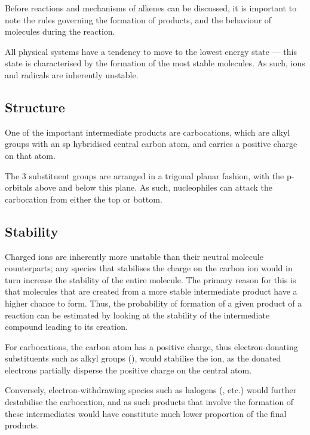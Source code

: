 		Before reactions and mechanisms of alkenes can be discussed, it is important to note the rules governing the formation
		of products, and the behaviour of molecules during the reaction.

		All physical systems have a tendency to move to the lowest energy state –– this state is characterised by the formation
		of the most stable molecules. As such, ions and radicals are inherently unstable.

		\subsection{Structure}

			One of the important intermediate products are carbocations, which are alkyl groups with an sp hybridised
			central carbon atom, and carries a positive charge on that atom.


			The 3 substituent groups are arranged in a trigonal planar fashion, with the p-orbitals above and below this
			plane. As such, nucleophiles can attack the carbocation from either the top or bottom.



		\subsection{Stability}

			Charged ions are inherently more unstable than their neutral molecule counterparts; any species that stabilises
			the charge on the carbon ion would in turn increase the stability of the entire molecule. The primary reason for
			this is that molecules that are created from a more stable intermediate product have a higher chance to form. Thus,
			the probability of formation of a given product of a reaction can be estimated by looking at the stability of
			the intermediate compound leading to its creation.

			For carbocations, the carbon atom has a positive charge, thus electron-donating substituents such as alkyl
			groups (), would stabilise the ion, as the donated electrons partially disperse the positive charge on the
			central atom.

			Conversely, electron-withdrawing species such as halogens (, \ch{\chlorine} etc.) would further destabilise
			the carbocation, and as such products that involve the formation of these intermediates would have constitute much
			lower proportion of the final products.


